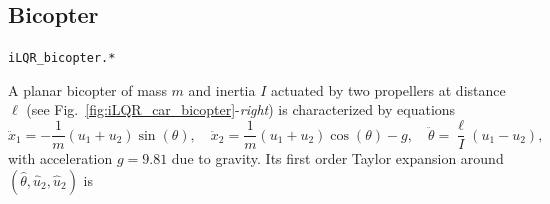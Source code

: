 \documentclass[10pt,a4paper]{article} %
\newcommand{\filename}[1]{\colorbox{rr2}{\color{white}\texttt{#1}}}
\begin{document}
\subsection{Bicopter}
\begin{flushright}
\filename{iLQR\_bicopter.*}
\end{flushright}

A planar bicopter of mass $m$ and inertia $I$ actuated by two propellers at distance $\ell$ (see Fig.~\ref{fig:iLQR_car_bicopter}-\emph{right}) is characterized by equations
\begin{equation*}
	\ddot{x}_1 = -\frac{1}{m} (u_1 + u_2) \sin(\theta),\quad
	\ddot{x}_2 = \frac{1}{m} (u_1 + u_2) \cos(\theta) - g,\quad
	\ddot{\theta} = \frac{\ell}{I} (u_1 - u_2),
\end{equation*}
with acceleration $g\!=\!9.81$ due to gravity. Its first order Taylor expansion around $(\hat{\theta},\hat{u}_2,\hat{u}_2)$ is
\end{document}
